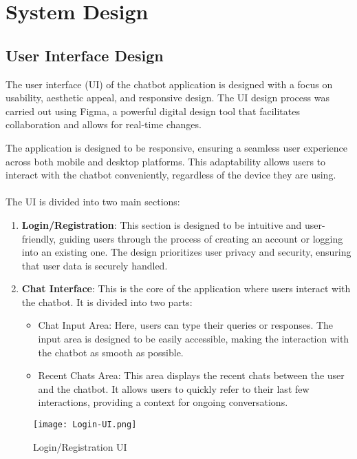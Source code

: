 \chapter{System Design}

\section{User Interface Design}
The user interface (UI) of the chatbot application is designed with a focus on usability, aesthetic appeal, and responsive design. The UI design process was carried out using Figma, a powerful digital design tool that facilitates collaboration and allows for real-time changes.

The application is designed to be responsive, ensuring a seamless user experience across both mobile and desktop platforms. This adaptability allows users to interact with the chatbot conveniently, regardless of the device they are using.
\\\\The UI is divided into two main sections:

\begin{enumerate}
    \item \textbf{Login/Registration}: This section is designed to be intuitive and user-friendly, guiding users through the process of creating an account or logging into an existing one. The design prioritizes user privacy and security, ensuring that user data is securely handled.
    \item \textbf{Chat Interface}: This is the core of the application where users interact with the chatbot. It is divided into two parts:
    \begin{itemize}
      \item Chat Input Area: Here, users can type their queries or responses. The input area is designed to be easily accessible, making the interaction with the chatbot as smooth as possible.
      \item Recent Chats Area: This area displays the recent chats between the user and the chatbot. It allows users to quickly refer to their last few interactions, providing a context for ongoing conversations.

    \end{itemize}
    
\end{enumerate}
\begin{figure}[h]
  \centering
  \texttt{[image: Login-UI.png]}
  \caption{Login/Registration UI}\label{fig:login-ui}
\end{figure}

